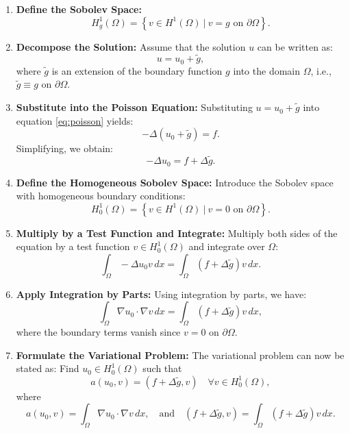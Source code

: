 \documentclass[class=article, crop=false]{standalone}
\begin{document}
\begin{enumerate}
    \item \textbf{Define the Sobolev Space:}
    $$
    H^1_g(\Omega) = \left\{ v \in H^1(\Omega) \ \bigg| \ v = g \text{ on } \partial\Omega \right\}.
    $$
    
    \item \textbf{Decompose the Solution:}
    Assume that the solution $u$ can be written as:
    $$
    u = u_0 + \tilde{g},
    $$
    where $\tilde{g}$ is an extension of the boundary function $g$ into the domain $\Omega$, i.e., $\tilde{g} \equiv g$ on $\partial\Omega$.

    \item \textbf{Substitute into the Poisson Equation:}
    Substituting $u = u_0 + \tilde{g}$ into equation \eqref{eq:poisson} yields:
    $$
    -\Delta (u_0 + \tilde{g}) = f.
    $$
    Simplifying, we obtain:
    $$
    -\Delta u_0 = f + \Delta \tilde{g}.
    $$
    
    \item \textbf{Define the Homogeneous Sobolev Space:}
    Introduce the Sobolev space with homogeneous boundary conditions:
    $$
    H^1_0(\Omega) = \left\{ v \in H^1(\Omega) \ \bigg| \ v = 0 \text{ on } \partial\Omega \right\}.
    $$
    
    \item \textbf{Multiply by a Test Function and Integrate:}
    Multiply both sides of the equation by a test function $v \in H^1_0(\Omega)$ and integrate over $\Omega$:
    $$
    \int_{\Omega} -\Delta u_0 v \, dx = \int_{\Omega} \left( f + \Delta \tilde{g} \right) v \, dx.
    $$
    
    \item \textbf{Apply Integration by Parts:}
    Using integration by parts, we have:
    $$
    \int_{\Omega} \nabla u_0 \cdot \nabla v \, dx = \int_{\Omega} \left( f + \Delta \tilde{g} \right) v \, dx,
    $$
    where the boundary terms vanish since $v = 0$ on $\partial\Omega$.
    
    \item \textbf{Formulate the Variational Problem:}
    The variational problem can now be stated as: Find $u_0 \in H^1_0(\Omega)$ such that
    \begin{equation}
        a(u_0, v) = (f + \Delta \tilde{g}, v) \quad \forall v \in H^1_0(\Omega),
        \label{eq:variational}
    \end{equation}
    where
    $$
    a(u_0, v) = \int_{\Omega} \nabla u_0 \cdot \nabla v \, dx, \quad \text{and} \quad 
    (f + \Delta \tilde{g}, v) = \int_{\Omega} (f + \Delta \tilde{g}) v \, dx.
    $$
\end{enumerate}
\end{document}
